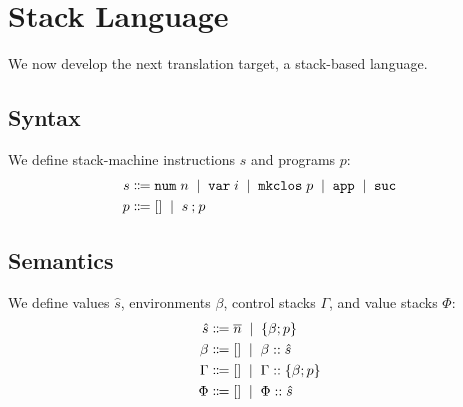 \documentclass[12pt]{article}
\newcommand{\tup}[1]{\langle #1 \rangle}
\newcommand{\alt}{\;\; | \;\;}
\newcommand{\defi}{\Coloneqq}
\newcommand{\nil}{[]}
\newcommand{\h}[1]{\hat{#1}}
\newcommand{\n}[1]{\overline{#1}}
\newcommand{\cl}[2]{\{ #1 ; #2 \}}
\newcommand{\sapp}{\mathtt{app}}
\newcommand{\sev}[4]{\ensuremath{\langle #1; #2 \rangle \rightarrow \langle #3; #4 \rangle}}
\newcommand{\sevv}[3]{\ensuremath{#1 \vdash #2 \downarrow^{\mathrm{v}} #3}}
\newcommand{\e}{e} %
\renewcommand{\b}{b} %
\renewcommand{\h}{h}
\newcommand{\snum}{\mathtt{num} \;}
\newcommand{\svar}{\mathtt{var} \;}
\newcommand{\slam}{\mathtt{mkclos} \;}
\renewcommand{\sapp}{\mathtt{app}}
\begin{document}
\renewcommand{\tup}[1]{\langle #1 \rangle}%

\renewcommand{\h}{\hat}%




\section*{Stack Language}

\renewcommand{\snum}[1]{\mathtt{num} \; #1}%
\renewcommand{\svar}[1]{\mathtt{var} \; #1}%
\renewcommand{\slam}[1]{\mathtt{mkclos} \; #1}%
\renewcommand{\sapp}{\mathtt{app}}%
\newcommand{\ssuc}{\mathtt{suc}}


\renewcommand{\b}{\beta}
\newcommand{\G}{\Gamma}
\newcommand{\Ph}{\Phi}
\newcommand{\Ps}{\Psi}

\newcommand{\hs}{\hat{s}}


\renewcommand{\sev}[2]{\ensuremath{#1 \downarrow #2}}%
\newcommand{\sstep}[4]{\ensuremath{\tup{#1, #2} \rightarrow \tup{#3, #4}}}
\newcommand{\ssteps}[4]{\ensuremath{\tup{#1, #2} \rightarrow^* \tup{#3, #4}}}
\renewcommand{\sevv}[3]{\ensuremath{#1 \vdash #2 \uparrow #3}}%


We now develop the next translation target, a stack-based language.

\subsection*{Syntax}

We define stack-machine instructions $s$ and programs $p$:
\begin{align*}
  s &\defi \snum{n} \alt \svar{i} \alt \slam{p} \alt \sapp \alt \ssuc \\
  p &\defi \nil \alt s \seq p
\end{align*}

\subsection*{Semantics}

We define values $\h{s}$, environments $\b$, control stacks $\G$, and value stacks $\Ph$:
\begin{align*}
  \hs &\defi \n{n} \alt \cl{\b}{p} \\
  \b &\defi \nil \alt \b \cons \hs \\
  \G &\defi \nil \alt \G \cons \cl{\b}{p} \\
  \Ph &\defi \nil \alt \Ph \cons \hs \\
\end{align*}
\end{document}
